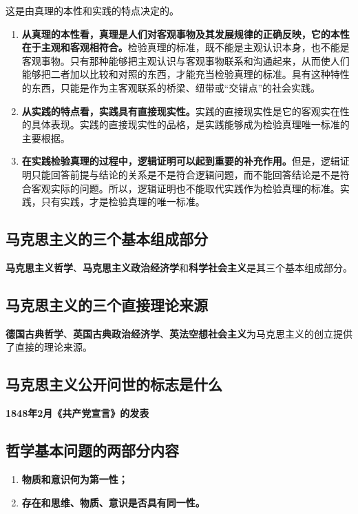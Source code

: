 \documentclass[12pt, a4paper, oneside]{ctexbook}
\begin{document}
这是由真理的本性和实践的特点决定的。
\begin{enumerate}
\item \textbf{从真理的本性看，真理是人们对客观事物及其发展规律的正确反映，它的本性在于主观和客观相符合。}检验真理的标准，既不能是主观认识本身，也不能是客观事物。只有那种能够把主观认识与客观事物联系和沟通起来，从而使人们能够把二者加以比较和对照的东西，才能充当检验真理的标准。具有这种特性的东西，只能是作为主客观联系的桥梁、纽带或“交错点”的社会实践。
\item \textbf{从实践的特点看，实践具有直接现实性。}实践的直接现实性是它的客观实在性的具体表现。实践的直接现实性的品格，是实践能够成为检验真理唯一标准的主要根据。
\item \textbf{在实践检验真理的过程中，逻辑证明可以起到重要的补充作用。}但是，逻辑证明只能回答前提与结论的关系是不是符合逻辑问题，而不能回答结论是不是符合客观实际的问题。所以，逻辑证明也不能取代实践作为检验真理的标准。实践，只有实践，才是检验真理的唯一标准。
\end{enumerate}

\subsection{马克思主义的三个基本组成部分}

\textbf{马克思主义哲学}、\textbf{马克思主义政治经济学}和\textbf{科学社会主义}是其三个基本组成部分。

\subsection{马克思主义的三个直接理论来源}

\textbf{德国古典哲学}、\textbf{英国古典政治经济学}、\textbf{英法空想社会主义}为马克思主义的创立提供了直接的理论来源。

\subsection{马克思主义公开问世的标志是什么}

\textbf{1848年2月《共产党宣言》的发表}

\subsection{哲学基本问题的两部分内容}

\begin{enumerate}
\item \textbf{物质和意识何为第一性；}
\item \textbf{存在和思维、物质、意识是否具有同一性。}
\end{enumerate}
\end{document}

